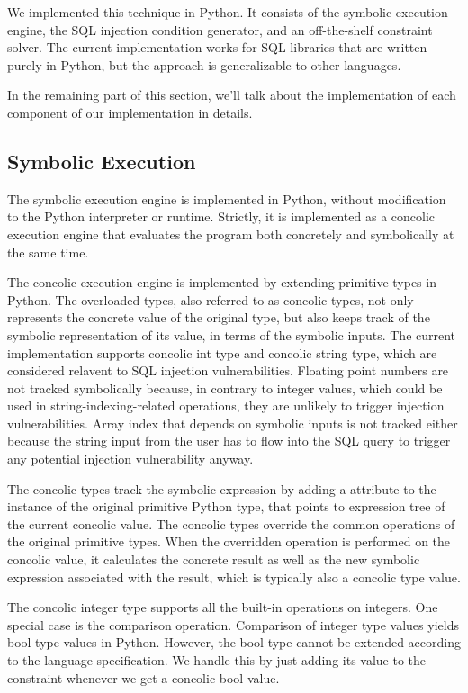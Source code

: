 \documentclass[conference]{IEEEtran}
\begin{document}
We implemented this technique in Python. It consists of the symbolic execution engine, the SQL injection condition generator, and an off-the-shelf constraint solver.
The current implementation works for SQL libraries that are written purely in Python, but the approach is generalizable to other languages.

In the remaining part of this section, we'll talk about the implementation of each component of our implementation in details.

\subsection{Symbolic Execution}
\label{symbolic execution}

The symbolic execution engine is implemented in Python, without modification to the Python interpreter or runtime. Strictly, it is implemented as a concolic execution engine that evaluates the program both concretely and symbolically at the same time.

The concolic execution engine is implemented by extending primitive types in Python. The overloaded types, also referred to as concolic types, not only represents the concrete value of the original type, but also keeps track of the symbolic representation of its value, in terms of the symbolic inputs. The current implementation supports concolic int type and concolic string type, which are considered relavent to SQL injection vulnerabilities. Floating point numbers are not tracked symbolically because, in contrary to integer values, which could be used in string-indexing-related operations, they are unlikely to trigger injection vulnerabilities. Array index that depends on symbolic inputs is not tracked either because the string input from the user has to flow into the SQL query to trigger any potential injection vulnerability anyway.

The concolic types track the symbolic expression by adding a attribute to the instance of the original primitive Python type, that points to expression tree of the current concolic value. The concolic types override the common operations of the original primitive types. When the overridden operation is performed on the concolic value, it calculates the concrete result as well as the new symbolic expression associated with the result, which is typically also a concolic type value.

The concolic integer type supports all the built-in operations on integers. One special case is the comparison operation. Comparison of integer type values yields bool type values in Python. However, the bool type cannot be extended according to the language specification. We handle this by just adding its value to the constraint whenever we get a concolic bool value.
\end{document}
